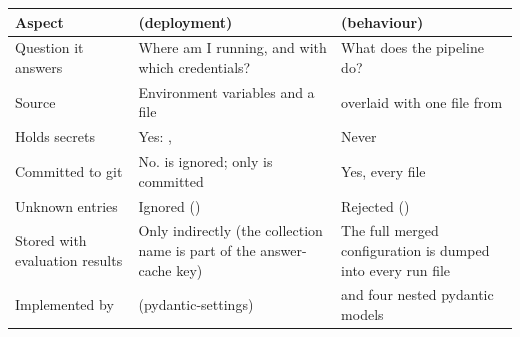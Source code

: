\begin{center}
\begin{tabularx}{\textwidth}{@{}>{\raggedright\arraybackslash}p{3.3cm}LL@{}}
\toprule
\textbf{Aspect} & \textbf{ (deployment)} & \textbf{ (behaviour)}\\
\midrule
Question it answers & Where am I running, and with which credentials? & What does the pipeline do?\\
Source & Environment variables and a  file &  overlaid with one file from \\
Holds secrets & Yes: ,  & Never\\
Committed to git & No.  is ignored; only  is committed & Yes, every file\\
Unknown entries & Ignored () & Rejected ()\\
Stored with evaluation results & Only indirectly (the collection name is part of the answer-cache key) & The full merged configuration is dumped into every run file\\
Implemented by &  (pydantic-settings) &  and four nested pydantic models\\
\bottomrule
\end{tabularx}
\end{center}

